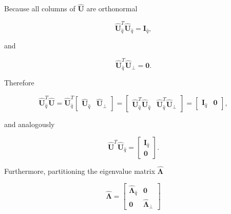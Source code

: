 \documentclass[english]{pwr_wmat_praca_dyplomowa}
\theoremstyle{definition}
\theoremstyle{remark}
\begin{document}
Because all columns of $\widehat{\mathbf{U}}$ are orthonormal

\begin{equation}
    \widehat{\mathbf{U}}_{\widehat{q}}^T \widehat{\mathbf{U}}_{\widehat{q}} = \mathbf{I}_{\widehat{q}},
\end{equation}

and 

\begin{equation}
    \widehat{\mathbf{U}}_{\widehat{q}}^T \widehat{\mathbf{U}}_\perp = \mathbf{0}.
\end{equation}

Therefore

\begin{equation}
    \widehat{\mathbf{U}}_{\widehat{q}}^T \widehat{\mathbf{U}} 
    = \widehat{\mathbf{U}}_{\widehat{q}}^T \begin{bmatrix}\widehat{\mathbf{U}}_{\widehat{q}} & \widehat{\mathbf{U}}_\perp \end{bmatrix}
    = \begin{bmatrix}\widehat{\mathbf{U}}_{\widehat{q}}^T\widehat{\mathbf{U}}_{\widehat{q}} & \widehat{\mathbf{U}}_{\widehat{q}}^T\widehat{\mathbf{U}}_\perp \end{bmatrix}
    = \begin{bmatrix} \mathbf{I}_{\widehat{q}} & \mathbf{0} \end{bmatrix},
\end{equation}

and analogously

\begin{equation}
    \widehat{\mathbf{U}}^T \widehat{\mathbf{U}}_{\widehat{q}}
    = \begin{bmatrix} \mathbf{I}_{\widehat{q}} \\ \mathbf{0} \end{bmatrix}.
\end{equation}

Furthermore, partitioning the eigenvalue matrix $\widehat{\boldsymbol{\Lambda}}$

\begin{equation}
    \widehat{\boldsymbol{\Lambda}} = 
    \begin{bmatrix}
        \widehat{\boldsymbol{\Lambda}}_{\widehat{q}} & \mathbf{0} \\
        \mathbf{0} & \widehat{\boldsymbol{\Lambda}}_\perp     
    \end{bmatrix}
\end{equation}
\end{document}
